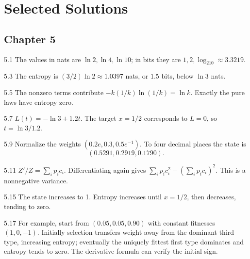 \documentclass[11pt,oneside,openany]{book}
\theoremstyle{definition}
\theoremstyle{remark}
\newenvironment{answers}{\begin{description}[leftmargin=2.9em,labelwidth=2.5em,labelsep=.4em,itemsep=8pt,font=\normalfont\bfseries]}{\end{description}}
\numberwithin{equation}{chapter}
\begin{document}
\clearpage\backmatter
\chapter*{Selected Solutions}
\section*{Chapter 5}
\begin{answers}
\item[5.1] The values in nats are $\ln2,\ln4,\ln10$; in bits they are $1,2,\log_210\approx3.3219$.
\item[5.3] The entropy is $(3/2)\ln2\approx1.0397$ nats, or $1.5$ bits, below $\ln3$ nats.
\item[5.5] The nonzero terms contribute $-k(1/k)\ln(1/k)=\ln k$. Exactly the pure laws have entropy zero.
\item[5.7] $L(t)=-\ln3+1.2t$. The target $x=1/2$ corresponds to $L=0$, so $t=\ln3/1.2$.
\item[5.9] Normalize the weights $(0.2e,0.3,0.5e^{-1})$. To four decimal places the state is
\[
(0.5291,0.2919,0.1790).
\]
\item[5.11] $Z'/Z=\sum_i p_ic_i$. Differentiating again gives $\sum_i p_ic_i^2-(\sum_i p_ic_i)^2$. This is a nonnegative variance.
\item[5.15] The state increases to 1. Entropy increases until $x=1/2$, then decreases, tending to zero.
\item[5.17] For example, start from $(0.05,0.05,0.90)$ with constant fitnesses $(1,0,-1)$. Initially selection transfers weight away from the dominant third type, increasing entropy; eventually the uniquely fittest first type dominates and entropy tends to zero. The derivative formula can verify the initial sign.
\end{answers}
\end{document}
